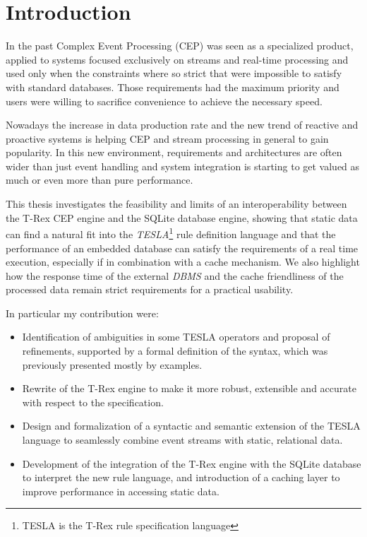 \chapter*{Introduction}
In the past Complex Event Processing (CEP) \cite{cep-book} was seen as a specialized product, applied to systems focused exclusively on streams and real-time processing and used only when the constraints where so strict that were impossible to satisfy with standard databases. Those requirements had the maximum priority and users were willing to sacrifice convenience to achieve the necessary speed.

Nowadays the increase in data production rate and the new trend of reactive and proactive systems is helping CEP and stream processing in general to gain popularity. In this new environment, requirements and architectures are often wider than just event handling and system integration is starting to get valued as much or even more than pure performance.

This thesis investigates the feasibility and limits of an interoperability between the T-Rex CEP engine and the SQLite database engine, showing that static data can find a natural fit into the \emph{TESLA}\footnote{TESLA is the T-Rex rule specification language} \cite{tesla} rule definition language and that the performance of an embedded database can satisfy the requirements of a real time execution, especially if in combination with a cache mechanism. We also highlight how the response time of the external \emph{DBMS} and the cache friendliness of the processed data remain strict requirements for a practical usability.

In particular my contribution were:
\begin{itemize}[noitemsep,topsep=0pt]
\item Identification of ambiguities in some TESLA operators and proposal of refinements, supported by a formal definition of the syntax, which was previously presented mostly by examples.
\item Rewrite of the T-Rex engine to make it more robust, extensible and accurate with respect to the specification.
\item Design and formalization of a syntactic and semantic extension of the TESLA language to seamlessly combine event streams with static, relational data.
\item Development of the integration of the T-Rex engine with the SQLite database to interpret the new rule language, and introduction of a caching layer to improve performance in accessing static data.
\end{itemize}

